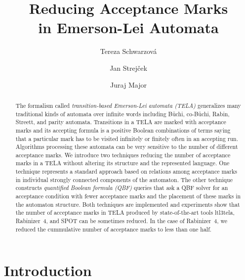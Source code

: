 \documentclass[a4paper,UKenglish,cleveref, autoref, anonymous, thm-restate]{lipics-v2021}
\title{Reducing Acceptance Marks \\ in Emerson-Lei Automata}
\author{Tereza Schwarzov\'{a}}{Faculty of Informatics, Masaryk University, Brno, Czech Republic}{xschwar3@mail.muni.cz}{}{}
\author{Jan Strej\v{c}ek}{Faculty of Informatics, Masaryk University, Brno, Czech Republic}{strejcek@fi.muni.cz}{https://orcid.org/0000-0001-5873-403X}{}
\author{Juraj Major}{Faculty of Informatics, Masaryk University, Brno, Czech Republic}{major@fi.muni.cz}{}{}
\begin{document}
\maketitle


\begin{abstract}
  The formalism called \emph{transition-based Emerson-Lei automata
    (TELA)} generalizes many traditional kinds of automata over
  infinite words including Büchi, co-Büchi, Rabin, Streett, and parity
  automata. Transitions in a TELA are marked with acceptance marks and
  its accepting formula is a positive Boolean combinations of terms
  saying that a particular mark has to be visited infinitely or
  finitely often in an accepting run. Algorithms processing these
  automata can be very sensitive to the number of different acceptance
  marks. We introduce two techniques reducing the number of acceptance
  marks in a TELA without altering its structure and the represented
  language. One technique represents a standard approach based on
  relations among acceptance marks in individual strongly connected
  components of the automaton. The other technique constructs
  \emph{quantified Boolean formula (QBF)} queries that ask a QBF
  solver for an acceptance condition with fewer acceptance marks and
  the placement of these marks in the automaton structure. Both
  techniques are implemented and experiments show that the number of
  acceptance marks in TELA produced by state-of-the-art tools
  ltl3tela, Rabinizer~4, and SPOT can be sometimes reduced. In the
  case of Rabinizer~4, we reduced the cummulative number of acceptance
  marks to less than one half.
\end{abstract}



\section{Introduction}

\end{document}
